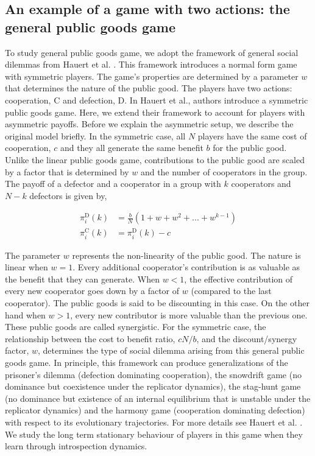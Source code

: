 \documentclass[11pt]{article}
\theoremstyle{plainCl1}
\theoremstyle{plainCl2}
\newcommand{\C}{\mathrm{C}}
\newcommand{\D}{\mathrm{D}}
\begin{document}
\subsection*{An example of a  game with two actions: the general public goods game}

To study general public goods game, we adopt the framework of general social dilemmas from Hauert et al. \cite{Hauert:JTB:2006a}. This framework introduces a normal form game with symmetric players. The game's properties are determined by a parameter $w$ that determines the nature of the public good. The players have two actions: cooperation, $\C$ and defection, $\D$. In Hauert et al., authors introduce a symmetric public goods game. Here, we extend their framework to account for players with asymmetric payoffs. Before we explain the asymmetric setup, we describe the original model briefly. In the symmetric case, all $N$ players have the same cost of cooperation, $c$ and they all generate the same benefit $b$ for the public good. Unlike the linear public goods game, contributions to the public good are scaled by a factor that is determined by $w$ and the number of cooperators in the group. The payoff of a defector and a cooperator in a group with $k$ cooperators and $N-k$ defectors is given by, 

\begin{align}
\pi^{\D}_i(k) &= \frac{b}{N}(1 + w + w^2 + ... + w^{k-1}) \\[15pt]
\pi^{\C}_i(k) &= \pi^{\D}_i(k) - c
\label{Eq:payoff-synergistic-symmetric}
\end{align} 

\noindent The parameter $w$ represents the non-linearity of the public good. The nature is linear when $w = 1$. Every additional cooperator's contribution is as valuable as the benefit that they can generate. When $w < 1$, the effective contribution of every new cooperator goes down by a factor of $w$ (compared to the last cooperator). The public goods is said to be discounting in this case. On the other hand when $w > 1$, every new contributor is more valuable than the previous one. These public goods are called synergistic. For the symmetric case, the relationship between the cost to benefit ratio, $cN/b$, and the discount/synergy factor, $w$, determines the type of social dilemma arising from this general public goods game. In principle, this framework can produce generalizations of the prisoner's dilemma (defection dominating cooperation), the snowdrift game (no dominance but coexistence under the replicator dynamics), the stag-hunt game (no dominance but existence of an internal equilibrium that is unstable under the replicator dynamics) and the harmony game (cooperation dominating defection) with respect to its evolutionary trajectories. For more details see Hauert et al. \cite{Hauert:JTB:2006a}. We study the long term stationary behaviour of players in this game when they learn through introspection dynamics. \\ 
\end{document}
